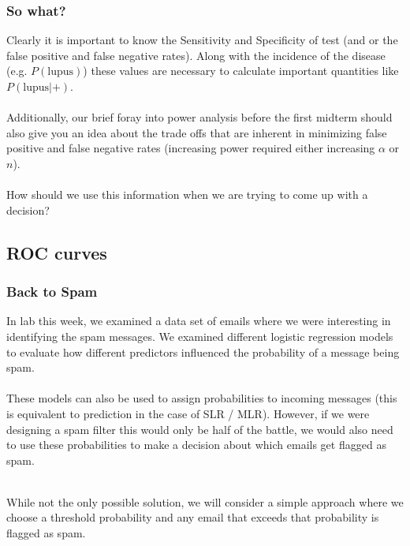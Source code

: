 \begin{frame}
\frametitle{So what?}

Clearly it is important to know the Sensitivity and Specificity of test (and or the false positive and false negative rates). Along with the incidence of the disease (e.g. $P(\text{lupus})$) these values are necessary to calculate important quantities like $P(\text{lupus} | + )$. \\
~\\
Additionally, our brief foray into power analysis before the first midterm should also give you an idea about the trade offs that are inherent in minimizing false positive and false negative rates (increasing power required either increasing $\alpha$ or $n$).\\
~\\
How should we use this information when we are trying to come up with a decision?
\end{frame}


\subsection{ROC curves}


\begin{frame}
\frametitle{Back to Spam}

In lab this week, we examined a data set of emails where we were interesting in identifying the spam messages. We examined different logistic regression models to evaluate how different predictors influenced the probability of a message being spam.\\

~\\

These models can also be used to assign probabilities to incoming messages (this is equivalent to prediction in the case of SLR / MLR). However, if we were designing a spam filter this would only be half of the battle, we would also need to use these probabilities to make a decision about which emails get flagged as spam.\\

~\\ \pause

While not the only possible solution, we will consider a simple approach where we choose a threshold probability and any email that exceeds that probability is flagged as spam.

\end{frame}


